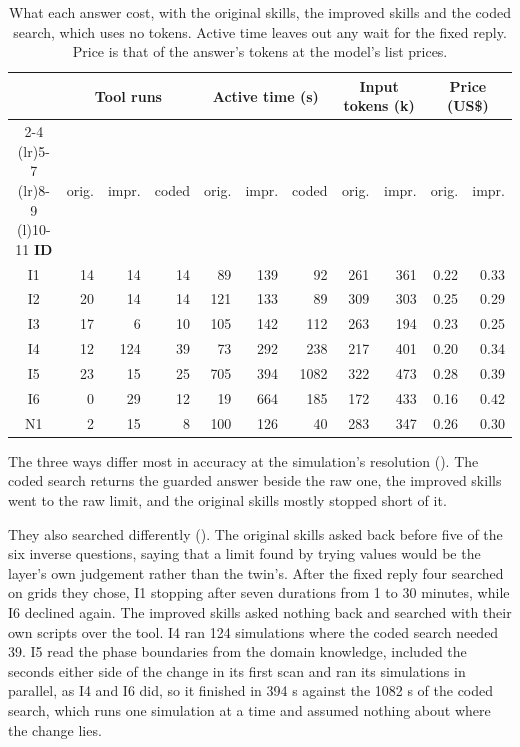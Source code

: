   \begin{table}[H]
    \centering
    \small
    \setlength{\tabcolsep}{5pt}
    \begin{tabular}{@{}crrrrrrrrrr@{}}
      \toprule
      & \multicolumn{3}{c}{\textbf{Tool runs}} & \multicolumn{3}{c}{\textbf{Active time (s)}}
        & \multicolumn{2}{c}{\textbf{Input tokens (k)}} & \multicolumn{2}{c}{\textbf{Price (US\$)}} \\
      \cmidrule(lr){2-4} \cmidrule(lr){5-7} \cmidrule(lr){8-9} \cmidrule(l){10-11}
      \textbf{ID} & orig. & impr. & coded & orig. & impr. & coded & orig. & impr. & orig. & impr. \\
      \midrule
      I1 & 14 & 14  & 14 & 89  & 139 & 92   & 261 & 361 & 0.22 & 0.33 \\
      I2 & 20 & 14  & 14 & 121 & 133 & 89   & 309 & 303 & 0.25 & 0.29 \\
      I3 & 17 & 6   & 10 & 105 & 142 & 112  & 263 & 194 & 0.23 & 0.25 \\
      I4 & 12 & 124 & 39 & 73  & 292 & 238  & 217 & 401 & 0.20 & 0.34 \\
      I5 & 23 & 15  & 25 & 705 & 394 & 1082 & 322 & 473 & 0.28 & 0.39 \\
      I6 & 0  & 29  & 12 & 19  & 664 & 185  & 172 & 433 & 0.16 & 0.42 \\
      N1 & 2  & 15  & 8  & 100 & 126 & 40   & 283 & 347 & 0.26 & 0.30 \\
      \bottomrule
    \end{tabular}
    \caption{What each answer cost, with the original skills, the improved skills and the coded
    search, which uses no tokens. Active time leaves out any wait for the fixed reply. Price is
    that of the answer's tokens at the model's list prices.}
    \label{tab:results-cost}
  \end{table}

  The three ways differ most in accuracy at the simulation's resolution
  (). The coded search returns the guarded answer beside the raw one,
  the improved skills went to the raw limit, and the original skills mostly stopped short of it.

  They also searched differently (). The original skills asked back before
  five of the six inverse questions, saying that a limit found by trying values would be the
  layer's own judgement rather than the twin's. After the fixed reply four searched on grids
  they chose, I1 stopping after seven durations from 1 to 30 minutes, while I6 declined again.
  The improved skills asked nothing back and searched with their own scripts over the tool. I4 ran
  124 simulations where the coded search needed 39. I5 read the phase boundaries from the
  domain knowledge, included the seconds either side of the change in its first scan and ran its
  simulations in parallel, as I4 and I6 did, so it finished in 394 s against the 1082 s of the
  coded search, which runs one simulation at a time and assumed nothing about where the change
  lies.

